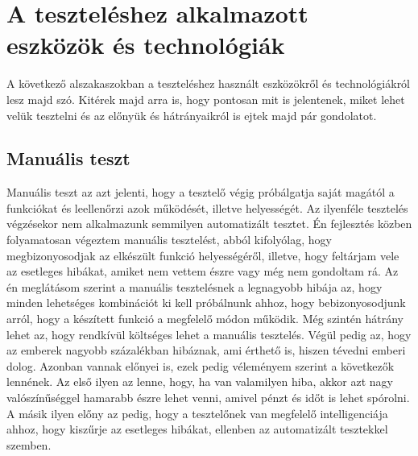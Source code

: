 \documentclass[]{thesis-ekf}
\theoremstyle{definition}
\theoremstyle{remark}
\begin{document}
	\section{A teszteléshez alkalmazott eszközök és technológiák}
			A következő alszakaszokban a teszteléshez használt eszközökről és technológiákról lesz majd szó. Kitérek majd arra is, hogy pontosan mit is jelentenek, miket lehet velük tesztelni és az előnyük és hátrányaikról is ejtek majd pár gondolatot.
	\subsection{Manuális teszt}
		Manuális teszt az azt jelenti, hogy a tesztelő végig próbálgatja saját magától a funkciókat és leellenőrzi azok működését, illetve helyességét. Az ilyenféle tesztelés végzésekor nem alkalmazunk semmilyen automatizált tesztet. Én fejlesztés közben folyamatosan végeztem manuális tesztelést, abból kifolyólag, hogy megbizonyosodjak az elkészült funkció helyességéről, illetve, hogy feltárjam vele az esetleges hibákat, amiket nem vettem észre vagy még nem gondoltam rá. Az én meglátásom szerint a manuális tesztelésnek a legnagyobb hibája az, hogy minden lehetséges kombinációt ki kell próbálnunk ahhoz, hogy bebizonyosodjunk arról, hogy a készített funkció a megfelelő módon működik. Még szintén hátrány lehet az, hogy rendkívül költséges lehet a manuális tesztelés. Végül pedig az, hogy az emberek nagyobb százalékban hibáznak, ami érthető is, hiszen tévedni emberi dolog. Azonban vannak előnyei is, ezek pedig véleményem szerint a következők lennének. Az első ilyen az lenne, hogy, ha van valamilyen hiba, akkor azt nagy valószínűséggel hamarabb észre lehet venni, amivel pénzt és időt is lehet spórolni. A másik ilyen előny az pedig, hogy a tesztelőnek van megfelelő intelligenciája ahhoz, hogy kiszűrje az esetleges hibákat, ellenben az automatizált tesztekkel szemben. 
		
\end{document}
